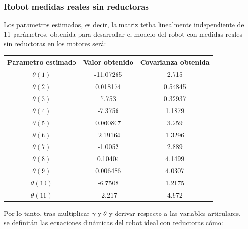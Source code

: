\subsubsection{Robot medidas reales sin reductoras}
Los parametros estimados, es decir, la matriz tetha linealmente independiente de 11 parámetros, obtenida para desarrollar el modelo del robot con medidas reales sin reductoras en los motores será:
\begin{center}
	\begin{tabular}{| c | c | c |}

		\hline
		Parametro estimado & Valor obtenido & Covarianza obtenida \\
		\hline
		$\theta(1) $ & -11.07265 & 2.715 \\
		\hline
		$\theta(2) $ & 0.018174 & 0.54845 \\
		\hline
		$\theta(3) $ & 7.753 & 0.32937 \\
		\hline
		$\theta(4) $ & -7.3756 & 1.1879 \\
		\hline
		$\theta(5) $ & 0.060807 & 3.259 \\
		\hline
		$\theta(6) $ & -2.19164 & 1.3296 \\
		\hline
		$\theta(7) $ & -1.0052 & 2.889 \\
		\hline
		$\theta(8) $ & 0.10404 & 4.1499 \\
		\hline
		$\theta(9) $ & 0.006486 & 4.0307 \\
		\hline
		$\theta(10) $ & -6.7508 & 1.2175 \\
		\hline
		$\theta(11) $ & -2.217 & 4.972 \\
		\hline
	\end{tabular}
\end{center}
Por lo tanto, tras multiplicar $\gamma$ y $\theta$ y derivar respecto a las variables articulares, se definirán las ecuaciones dinámicas del robot ideal con reductoras cómo:\\
